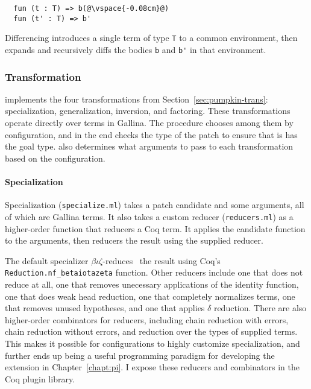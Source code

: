 \begin{lstlisting}
  fun (t : T) => b(@\vspace{-0.08cm}@)
  fun (t' : T) => b'
\end{lstlisting}
Differencing introduces a single term of type \lstinline{T} to a common environment,
then expands and recursively diffs the bodies \lstinline{b} and \lstinline{b'} in that environment.

\subsubsection{Transformation}
\label{sec:pumpkin-impl-trans}

\sysname implements the four transformations from Section~\ref{sec:pumpkin-trans}:
specialization, generalization, inversion, and factoring.
These transformations operate directly over terms in Gallina.
The \sysname procedure chooses among them by configuration,
and in the end checks the type of the patch to ensure that is has the goal type.
\sysname also determines what arguments to pass to each transformation based on the configuration.

\paragraph{Specialization} Specialization (\lstinline{specialize.ml}) takes a patch candidate and some arguments,
all of which are Gallina terms.
It also takes a custom reducer (\lstinline{reducers.ml}) %
as a higher-order function that reducers a Coq term.
It applies the candidate function to the arguments, then reducers the result using the supplied reducer.

The default specializer $\beta\iota\zeta$-reduces~\cite{equality} the result using Coq's
\lstinline{Reduction.nf_betaiotazeta} function. %
Other reducers include one that does not reduce at all, one that removes unecessary applications of the identity function, 
one that does weak head reduction, one that completely normalizes terms, one that removes unused hypotheses,
and one that applies $\delta$ reduction.
There are also higher-order combinators for reducers,
including chain reduction with errors, chain reduction without errors, and reduction over the types of supplied terms.
This makes it possible for configurations to highly customize specialization,
and further ends up being a useful programming paradigm for developing the \toolnamec extension in Chapter~\ref{chapt:pi}.
I expose these reducers and combinators in the Coq plugin library. %

